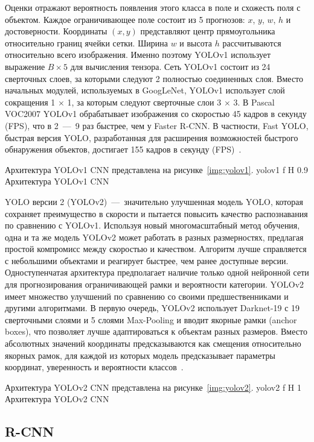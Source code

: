 Оценки отражают вероятность появления этого класса в поле и схожесть поля с объектом.
Каждое ограничивающее поле состоит из 5 прогнозов: $x$, $y$, $w$, $h$ и достоверности.
Координаты $(x, y)$ представляют центр прямоугольника относительно границ ячейки сетки.
Ширина $w$ и высота $h$ рассчитываются относительно всего изображения.
Именно поэтому YOLOv1 использует выражение $B \times 5$ для вычисления тензора.
Сеть YOLOv1 состоит из 24 сверточных слоев, за которыми следуют 2 полностью соединенных слоя.
Вместо начальных модулей, используемых в GoogLeNet, YOLOv1 использует слой сокращения 1 $\times$ 1, за которым следуют сверточные слои 3 $\times$ 3.
В Pascal VOC2007 YOLOv1 обрабатывает изображения со скоростью 45 кадров в секунду (FPS), что в 2~---~9 раз быстрее, чем у Faster R-CNN.
В частности, Fast YOLO, быстрая версия YOLO, разработанная для расширения возможностей быстрого обнаружения объектов, достигает 155 кадров в секунду (FPS)~\cite{base, all}.

Архитектура YOLOv1 CNN представлена на рисунке~\ref{img:yolov1}.
	{yolov1}
	{f}
	{H}
	{0.9\textwidth}
	{Архитектура YOLOv1 CNN}

YOLO версии 2 (YOLOv2)~---~значительно улучшенная модель YOLO, которая сохраняет преимущество в скорости и пытается повысить качество распознавания по сравнению с YOLOv1.
Используя новый многомасштабный метод обучения, одна и та же модель YOLOv2 может работать в разных размерностях, предлагая простой компромисс между скоростью и качеством.
Алгоритм лучше справляется с небольшими объектами и реагирует быстрее, чем ранее доступные версии.
Одноступенчатая архитектура предполагает наличие только одной нейронной сети для прогнозирования ограничивающей рамки и вероятности категории.
YOLOv2 имеет множество улучшений по сравнению со своими предшественниками и другими алгоритмами.
В первую очередь, YOLOv2 использует Darknet-19 с 19 сверточными слоями и 5 слоями Max-Pooling и вводит якорные рамки (anchor boxes), что позволяет лучше адаптироваться к объектам разных размеров.
Вместо абсолютных значений координаты предсказываются как смещения относительно якорных рамок, для каждой из которых модель предсказывает параметры координат, уверенность и вероятности классов~\cite{yolochina, yolobase}.

Архитектура YOLOv2 CNN представлена на рисунке~\ref{img:yolov2}.
	{yolov2}
	{f}
	{H}
	{1\textwidth}
	{Архитектура YOLOv2 CNN}

\subsection{R-CNN}


